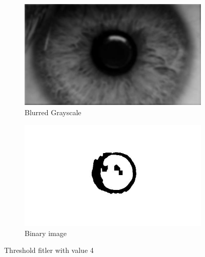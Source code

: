 \documentclass{article}
\begin{document}
%
%
\begin{figure}[H]
\centering

\begin{subfigure}{.5\textwidth}
  \centering
  \includegraphics[width=0.9\linewidth]{res/pupil/results/gray_to_low.jpg}
  \caption{Blurred Grayscale}
  \label{fig:original_img}
\end{subfigure}%
\begin{subfigure}{.5\textwidth}
  \centering
  \includegraphics[width=0.9\linewidth]{res/pupil/results/lowgray_to_bin.jpg}
  \caption{Binary image}
  \label{fig:gray_img}
\end{subfigure}


\caption{Threshold fitler with value 4}
\label{fig:result_pup_gray_to_bin}
\end{figure}
\end{document}
